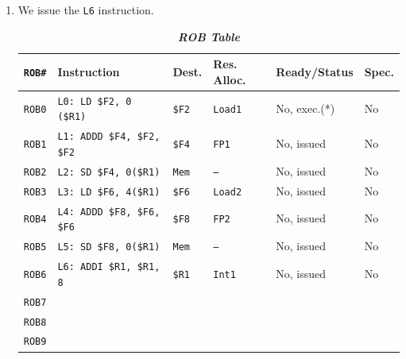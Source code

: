 \begin{enumerate}
    \newpage


    \item We issue the \texttt{L6} instruction.
    \begin{table}[!htp]
        \centering
        \begin{adjustbox}{width={\textwidth},totalheight={\textheight},keepaspectratio}
            \begin{tabular}{@{} l l l l l l @{}}
                \toprule
                \texttt{ROB\#}  & \textbf{Instruction} & \textbf{Dest.} & \textbf{Res. Alloc.} & \textbf{Ready/Status} & \textbf{Spec.} \\
                \midrule
                \texttt{ROB0}   & \texttt{L0: LD \$F2, 0 (\$R1)}    & \texttt{\$F2} & \texttt{Load1}    & No, exec.(*)  & No    \\ [.3em]
                \texttt{ROB1}   & \texttt{L1: ADDD \$F4, \$F2, \$F2}& \texttt{\$F4} & \texttt{FP1}      & No, issued    & No    \\ [.3em]
                \texttt{ROB2}   & \texttt{L2: SD \$F4, 0(\$R1)}     & \texttt{Mem}  & \texttt{--}       & No, issued    & No    \\ [.3em]
                \texttt{ROB3}   & \texttt{L3: LD \$F6, 4(\$R1)}     & \texttt{\$F6} & \texttt{Load2}    & No, issued    & No    \\ [.3em]
                \texttt{ROB4}   & \texttt{L4: ADDD \$F8, \$F6, \$F6}& \texttt{\$F8} & \texttt{FP2}      & No, issued    & No    \\ [.3em]
                \texttt{ROB5}   & \texttt{L5: SD \$F8, 0(\$R1)}     & \texttt{Mem}  & \texttt{--}       & No, issued    & No    \\ [.3em]
                \texttt{ROB6}   & \texttt{L6: ADDI \$R1, \$R1, 8}   & \texttt{\$R1} & \texttt{Int1}     & No, issued    & No    \\ [.3em]
                \texttt{ROB7}   &                                   &               &                   &               &       \\ [.3em]
                \texttt{ROB8}   &                                   &               &                   &               &       \\ [.3em]
                \texttt{ROB9}   &                                   &               &                   &               &       \\
                \bottomrule
            \end{tabular}
        \end{adjustbox}
        \caption*{\emph{\textbf{ROB Table}}}
    \end{table}



\end{enumerate}
